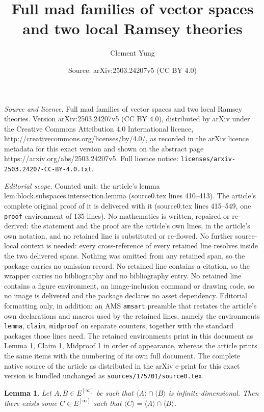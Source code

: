 \documentclass[10pt,a4paper]{amsart}
\title{Full mad families of vector spaces and two local Ramsey theories}
\author{Clement Yung}
\date{Source: arXiv:2503.24207v5 (CC BY 4.0)}
\newtheorem{lemma}{Lemma}
\renewcommand{\c}[1]{\langle #1 \rangle}
\begin{document}
\maketitle

\noindent\emph{Source and licence.} Full mad families of vector spaces and two local Ramsey theories. Version arXiv:2503.24207v5 (CC BY 4.0), distributed by arXiv under the Creative Commons Attribution 4.0 International licence, http://creativecommons.org/licenses/by/4.0/, as recorded in the arXiv licence metadata for this exact version and shown on the abstract page https://arxiv.org/abs/2503.24207v5. Full licence notice: \texttt{licenses/arxiv-2503.24207-CC-BY-4.0.txt}.\par\smallskip

\noindent\textit{Editorial scope.} Counted unit: the article's lemma lem:block.subspaces.intersection.lemma (source0.tex lines 410--413). The article's complete original proof of it is delivered with it (source0.tex lines 415--549, one \texttt{proof} environment of 135 lines). No mathematics is written, repaired or re-derived: the statement and the proof are the article's own lines, in the article's own notation, and no retained line is substituted or re-flowed.  No further source-local context is needed: every cross-reference of every retained line resolves inside the two delivered spans.  Nothing was omitted from any retained span, so the package carries no omission record.  No retained line contains a citation, so the wrapper carries no bibliography and no bibliography entry.  No retained line contains a figure environment, an image-inclusion command or drawing code, so no image is delivered and the package declares no asset dependency.  Editorial formatting only, in addition: an AMS \texttt{amsart} preamble that restates the article's own declarations and macros used by the retained lines, namely the environments \texttt{lemma}, \texttt{claim}, \texttt{midproof} on separate counters, together with the standard packages those lines need.  The retained environments print in this document as Lemma 1, Claim 1, Midproof 1 in order of appearance, whereas the article prints the same items with the numbering of its own full document.  The complete native source of the article as distributed in the arXiv e-print for this exact version is bundled unchanged as \texttt{sources/175701/source0.tex}.
\begin{lemma}
\label{lem:block.subspaces.intersection.lemma}
    Let $A,B \in E^{[\infty]}$ be such that $\c{A} \cap \c{B}$ is infinite-dimensional. Then there exists some $C \in E^{[\infty]}$ such that $\c{C} = \c{A} \cap \c{B}$.
\end{lemma}
\end{document}
